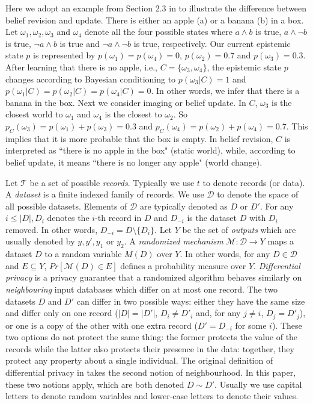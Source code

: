 \documentclass[11pt]{article}
\begin{document}
\begin{example}  Here we adopt an example from Section 2.3 in \cite{DuboisP93} to illustrate the difference between belief revision and update.  There is either an apple (a) or a banana (b) in a box.  Let $\omega_1, \omega_2, \omega_3$ and $\omega_4$ denote all the four possible states where $a\wedge b$ is true, $a\wedge \neg b$ is true, $\neg a \wedge b$ is true and $\neg a \wedge \neg b$ is true, respectively.   Our current epistemic state $p$ is represented by $p(\omega_1)=p(\omega_4) =0$, $p(\omega_2)=0.7$ and $p(\omega_3)=0.3$. After learning that there is no apple, i.e., $C=\{\omega_3, \omega_4\}$,  the epistemic state $p$ changes according to Bayesian conditioning to $p(\omega_3 | C) =1$ and $p(\omega_1 |C) = p(\omega_2 |C) = p(\omega_4 |C) =0$.  In other words, we infer that there is a banana in the box.  Next we consider imaging or belief update. In $C$, $\omega_3$ is the closest world to $\omega_1$ and $\omega_4$ is the closest to $\omega_2$.  So $p_C(\omega_3) = p(\omega_1)+ p(\omega_3) = 0.3$ and $p_C(\omega_4) = p(\omega_2)+ p(\omega_4) =0.7$. This implies that it is more probable that the box is empty.
In belief revision, $C$ is interpreted as ``there is no apple in the box" (static world), while, according to belief update, it means ``there is no longer any apple" (world change).

\end{example}

 

 
	Let $\mathcal{T}$ be a set of possible \emph{records}. Typically we use $t$ to denote records (or data).  A \emph{dataset} is a finite indexed family of records.  We use $\mathcal{D}$ to denote the space of all possible datasets. Elements of $\mathcal{D}$ are typically denoted as $D$ or $D'$.  For any $i\leq |D|, D_i$ denotes the $i$-th record in $D$ and $D_{-i}$ is the dataset $D$ with $D_i$ removed.  In other words, $D_{-i} = D\setminus \{D_i\}$.  Let $Y$ be the set of \emph{outputs} which are usually denoted by $y, y', y_1$ or $y_2$. A \emph{randomized mechanism} $\mathcal{M}: \mathcal{D}\rightarrow Y$ maps a dataset $D$ to a random variable $M(D) $ over $Y$.   In other words, for any $D\in \mathcal{D}$ and $E\subseteq Y$, $Pr[\mathcal{M}(D)\in E]$ defines a probability measure over $Y$.  \emph{Differential privacy} is a privacy guarantee that  a randomized algorithm behaves similarly on
	\emph{neighbouring} input databases which differ on at most one record.  The two
	datasets $D$ and $D'$ can differ in two possible ways: either they have the same size and differ only on one
	record ($|D|=|D'|$, $D_i\neq D'_i$ and, for any $j\neq i$, $D_j=D'_j$), or one is a copy of the other with one extra record ($D'=D_{-i}$ for some $i$). These two options do not protect the
	same thing: the former protects the value of the records while the latter also protects their presence
	in the data: together, they protect any property about a single individual.  The original definition of differential privacy in \cite{DworkMNS06} takes the second notion of neighbourhood.   In this paper, these two notions apply, which are both denoted $D\sim D'$. Usually we use capital letters to denote random variables and lower-case letters to denote their  values. 
	
\end{document}
